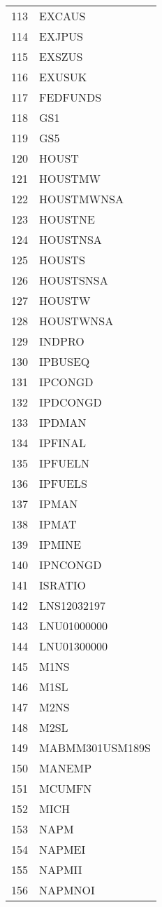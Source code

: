 \begin{table}[ht]
\begin{tabular}{rl}
  113 & EXCAUS \\ 
  114 & EXJPUS \\ 
  115 & EXSZUS \\ 
  116 & EXUSUK \\ 
  117 & FEDFUNDS \\ 
  118 & GS1 \\ 
  119 & GS5 \\ 
  120 & HOUST \\ 
  121 & HOUSTMW \\ 
  122 & HOUSTMWNSA \\ 
  123 & HOUSTNE \\ 
  124 & HOUSTNSA \\ 
  125 & HOUSTS \\ 
  126 & HOUSTSNSA \\ 
  127 & HOUSTW \\ 
  128 & HOUSTWNSA \\ 
  129 & INDPRO \\ 
  130 & IPBUSEQ \\ 
  131 & IPCONGD \\ 
  132 & IPDCONGD \\ 
  133 & IPDMAN \\ 
  134 & IPFINAL \\ 
  135 & IPFUELN \\ 
  136 & IPFUELS \\ 
  137 & IPMAN \\ 
  138 & IPMAT \\ 
  139 & IPMINE \\ 
  140 & IPNCONGD \\ 
  141 & ISRATIO \\ 
  142 & LNS12032197 \\ 
  143 & LNU01000000 \\ 
  144 & LNU01300000 \\ 
  145 & M1NS \\ 
  146 & M1SL \\ 
  147 & M2NS \\ 
  148 & M2SL \\ 
  149 & MABMM301USM189S \\ 
  150 & MANEMP \\ 
  151 & MCUMFN \\ 
  152 & MICH \\ 
  153 & NAPM \\ 
  154 & NAPMEI \\ 
  155 & NAPMII \\ 
  156 & NAPMNOI \\ 

\end{tabular}
\end{table}
